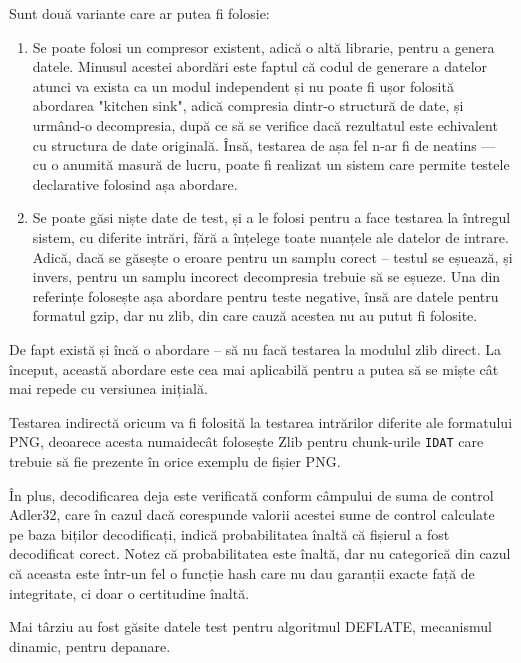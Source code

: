 \documentclass[a4paper,12pt]{report}
\begin{document}
Sunt două variante care ar putea fi folosie:
\begin{enumerate}
    \item
        Se poate folosi un compresor existent, adică o altă librarie, pentru a genera datele.
        Minusul acestei abordări este faptul că codul de generare a datelor atunci va exista
        ca un modul independent și nu poate fi ușor folosită abordarea "kitchen sink", adică
        compresia dintr-o structură de date, și urmând-o decompresia, după ce să se verifice
        dacă rezultatul este echivalent cu structura de date originală.
        Însă, testarea de așa fel n-ar fi de neatins --- cu o anumită masură de lucru,
        poate fi realizat un sistem care permite testele declarative folosind așa abordare.
    \item
        Se poate găsi niște date de test, și a le folosi pentru a face testarea
        la întregul sistem, cu diferite intrări, fără a înțelege toate nuanțele ale datelor de intrare.
        Adică, dacă se găsește o eroare pentru un samplu corect -- testul se eșuează,
        și invers, pentru un samplu incorect decompresia trebuie să se eșueze.
        Una din referințe \cite{gzip_impl} folosește așa abordare pentru teste negative,
        însă are datele pentru formatul gzip, dar nu zlib, din care cauză acestea nu au putut fi folosite.
\end{enumerate}

De fapt există și încă o abordare -- să nu facă testarea la modulul zlib direct.
La început, această abordare este cea mai aplicabilă pentru a putea să se miște cât mai repede cu versiunea inițială.

Testarea indirectă oricum va fi folosită la testarea intrărilor diferite ale formatului \ac{PNG},
deoarece acesta numaidecât folosește Zlib pentru chunk-urile \texttt{IDAT} care trebuie să fie prezente
în orice exemplu de fișier \ac{PNG}.

În plus, decodificarea deja este verificată conform câmpului de suma de control Adler32,
care în cazul dacă corespunde valorii acestei sume de control calculate pe baza biților decodificați,
indică probabilitatea înaltă că fișierul a fost decodificat corect. 
Notez că probabilitatea este înaltă, dar nu categorică din cazul că aceasta este într-un fel o funcție hash
care nu dau garanții exacte față de integritate, ci doar o certitudine înaltă.

Mai târziu au fost găsite datele test pentru algoritmul DEFLATE,
mecanismul dinamic, pentru depanare\cite{deflate_tests}.
\end{document}

